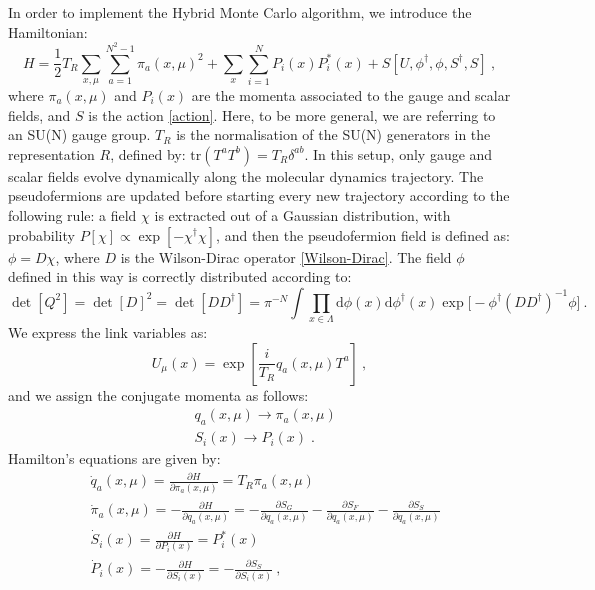 In order to implement the Hybrid Monte Carlo algorithm, we introduce the Hamiltonian:
\begin{equation}
H = \frac{1}{2} T_R\sum_{x,\mu}\sum_{a=1}^{N^2-1} \pi_a (x, \mu)^2 + \sum_x \sum_{i=1}^N P_i(x)P^*_i(x) + S[U,\phi^{\dagger},\phi,S^{\dagger},S] \: ,
\end{equation}
%
where $\pi_a(x,\mu)$ and $P_i(x)$ are the momenta associated to the gauge and scalar fields, and $S$ is the action \ref{action}. Here, to be more general, we are referring to an SU(N) gauge group. $T_R$ is the normalisation of the SU(N) generators in the representation $R$, defined by: $\mathrm{tr} (T^aT^b) = T_R \delta^{ab}$.
In this setup, only gauge and scalar fields evolve dynamically along the molecular dynamics trajectory. The pseudofermions are updated before starting every new trajectory according to the following rule: a field $\chi$ is extracted out of a Gaussian distribution, with probability $P[\chi] \propto \exp [-\chi^{\dagger} \chi]$, and then the pseudofermion field is defined as: $\phi = D \chi$, where $D$ is the Wilson-Dirac operator \ref{Wilson-Dirac}. The field $\phi$ defined in this way is correctly distributed according to:
\begin{equation}
\det[Q^2] = \det[D]^2 = \det[DD^{\dagger}] = \pi^{-N} \int \prod_{x \in \Lambda} \mathrm{d} \phi(x) \mathrm{d} \phi^{\dagger}(x) \exp \bigl[ 
-\phi^{\dagger}(DD^{\dagger})^{-1}  \phi \bigr] \: .
\end{equation}
%
We express the link variables as:
\begin{equation}
U_{\mu}(x)=\exp [\frac{i}{T_R} q_a(x,\mu) T^a] \: , 
\end{equation}
%
and we assign the conjugate momenta as follows:
\begin{equation}
\begin{split}
& q_a(x,\mu) \to \pi_a(x,\mu) \\
& S_i(x) \to P_i(x) \; .
\end{split}
\end{equation}
%
Hamilton's equations are given by:
\begin{equation}
\begin{split}
& \dot{q}_a(x,\mu) = \frac{\partial H}{\partial \pi_a(x,\mu)}  =T_R \pi_a(x,\mu) \\
& \dot{\pi}_a(x,\mu) = -\frac{\partial H}{\partial q_a(x,\mu)} = -\frac{\partial S_G}{\partial q_a(x,\mu)} -\frac{\partial S_F}{\partial q_a(x,\mu)} -\frac{\partial S_S}{\partial q_a(x,\mu)} \\
& \dot{S}_i(x) = \frac{\partial H}{\partial P_i(x)} = P^*_i(x) \\
& \dot{P}_i(x) =  -\frac{\partial H}{\partial S_i(x)} = -\frac{\partial S_S}{\partial S_i(x)}  \: ,\\ 
\end{split} 
\label{hamilton}
\end{equation} 

